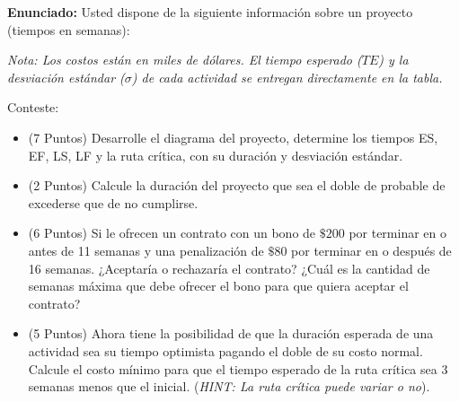 \documentclass[11pt, a4paper]{article}
\begin{document}
  \textbf{Enunciado:}
  Usted dispone de la siguiente información sobre un proyecto (tiempos en semanas):

  \begin{center}
  \small
  \end{center}

  \textit{Nota: Los costos están en miles de dólares. El tiempo esperado ($TE$) y la desviación estándar ($\sigma$) de cada actividad se entregan directamente en la tabla.}

  Conteste:
  \begin{itemize}
    \item[\textbf{i.}] (7 Puntos) Desarrolle el diagrama del proyecto, determine los tiempos ES, EF, LS, LF y la ruta crítica, con su duración y desviación estándar.
    \item[\textbf{ii.}] (2 Puntos) Calcule la duración del proyecto que sea el doble de probable de excederse que de no cumplirse.
    \item[\textbf{iii.}] (6 Puntos) Si le ofrecen un contrato con un bono de $\$200$ por terminar en o antes de 11 semanas y una penalización de $\$80$ por terminar en o después de 16 semanas. ¿Aceptaría o rechazaría el contrato? ¿Cuál es la cantidad de semanas máxima que debe ofrecer el bono para que quiera aceptar el contrato?
    \item[\textbf{iv.}] (5 Puntos) Ahora tiene la posibilidad de que la duración esperada de una actividad sea su tiempo optimista pagando el doble de su costo normal. Calcule el costo mínimo para que el tiempo esperado de la ruta crítica sea 3 semanas menos que el inicial. (\textit{HINT: La ruta crítica puede variar o no}).
  \end{itemize}
\end{document}
